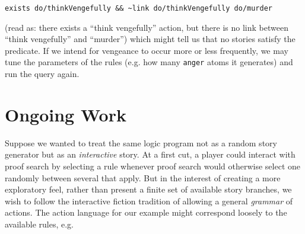 \documentclass[letterpaper]{article}
\begin{document}

\begin{verbatim}
exists do/thinkVengefully && ~link do/thinkVengefully do/murder
\end{verbatim}

(read as: there exists a ``think vengefully'' action, but there is no link
between ``think vengefully'' and ``murder'')
which might tell us that no stories satisfy the predicate. If we intend for
vengeance to occur more or less frequently, we may tune the parameters of
the rules (e.g. how many \verb|anger| atoms it generates) and run the query
again.






\section{Ongoing Work}

Suppose we wanted to treat the same logic program not as a random story
generator but as an {\em interactive} story.  At a first cut, a player
could interact with proof search by selecting a rule whenever proof search
would otherwise select one randomly between several that apply. But in the
interest of creating a more exploratory feel, rather than present a finite
set of available story branches, we wish to follow the interactive fiction
tradition of allowing a general {\em grammar} of actions. The action
language for our example might correspond loosely to the available rules,
e.g.
\end{document}
